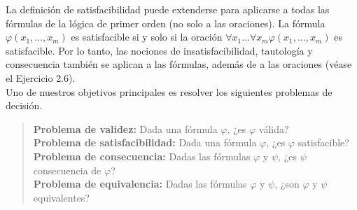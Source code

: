 \documentclass[12pt,a4paper]{book}
\begin{document}
    La definición de satisfacibilidad puede extenderse para aplicarse a todas las fórmulas de la lógica de primer orden (no
    solo a las oraciones). La fórmula $\varphi(x_{1},\dots,x_{m})$ es satisfacible si y solo si la oración
    $\forall x_{1}\dots\forall x_{m}\varphi(x_{1},\dots,x_{m})$ es satisfacible. Por lo tanto, las nociones de
    insatisfacibilidad, tautología y consecuencia también se aplican a las fórmulas, además de a las oraciones (véase el
    Ejercicio 2.6).\\
    Uno de nuestros objetivos principales es resolver los siguientes problemas de decisión.

    \begin{quote}
        \textbf{Problema de validez:} Dada una fórmula $\varphi$, ¿es $\varphi$ válida?\\
        \textbf{Problema de satisfacibilidad:} Dada una fórmula $\varphi$, ¿es $\varphi$ satisfacible?\\
        \textbf{Problema de consecuencia:} Dadas las fórmulas $\varphi$ y $\psi$, ¿es $\psi$ consecuencia de $\varphi$?\\
        \textbf{Problema de equivalencia:} Dadas las fórmulas $\varphi$ y $\psi$, ¿son $\varphi$ y $\psi$ equivalentes?
    \end{quote}
\end{document}
